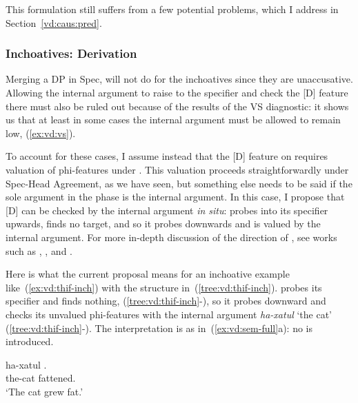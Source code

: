 \begin{exe}
\begin{xlist}
\begin{xlist}
\begin{exe}
\begin{exe}
\begin{xlist}
\begin{exe}
\begin{xlist}
\begin{exe}
\begin{xlist}
\begin{xlist}
\begin{exe}
\begin{xlist}
\begin{exe}
\begin{xlist}
\begin{exe}
\begin{exe}
\begin{exe}
\begin{xlist}
\begin{exe}
\begin{exe}
\begin{xlist}
\begin{xlist}
\begin{exe}
\begin{xlist}
This formulation still suffers from a few potential problems, which I address in Section~\ref{vd:caus:pred}.

		\subsubsection{Inchoatives: Derivation}
Merging a DP in Spec,{\vd} will not do for the inchoatives since they are unaccusative. Allowing the internal argument to raise to the specifier and check the [D] feature there must also be ruled out because of the results of the VS diagnostic: it shows us that at least in some cases the internal argument must be allowed to remain low, (\ref{ex:vd:vs}).

To account for these cases, I assume instead that the [D] feature on {\vd} requires valuation of phi-features under  \citep{nie17,schaefer17oup}. This valuation proceeds straightforwardly under Spec-Head Agreement, as we have seen, but something else needs to be said if the sole argument in the phase is the internal argument. In this case, I propose that [D] can be checked by the internal argument \emph{in situ}: {\vd} probes into its specifier upwards, finds no target, and so it probes downwards and is valued by the internal argument. For more in-depth discussion of the direction of , see works such as \cite{bejarrezac09}, \cite{zeijlstra12}, \cite{preminger13tlr} and \cite{deal15nels}.

Here is what the current proposal means for an inchoative example like~(\ref{ex:vd:thif-inch}) with the structure in~(\ref{tree:vd:thif-inch}). {\vd} probes its specifier and finds nothing, (\ref{tree:vd:thif-inch}-), so it probes downward and checks its unvalued phi-features with the internal argument \emph{ha-xatul} `the cat' (\ref{tree:vd:thif-inch}-). The interpretation is as in~(\ref{ex:vd:sem-full}a): no  is introduced.
 \begin{exe}
\ex \label{ex:vd:thif-inch}  
	{ \gll ha-xatul .\\
 	  the-cat fattened.\\
 	\glt `The cat grew fat.' } 
	
 \z 
	

\end{exe}
\end{xlist}
\end{exe}
\end{xlist}
\end{xlist}
\end{exe}
\end{exe}
\end{xlist}
\end{exe}
\end{exe}
\end{exe}
\end{xlist}
\end{exe}
\end{xlist}
\end{exe}
\end{xlist}
\end{xlist}
\end{exe}
\end{xlist}
\end{exe}
\end{xlist}
\end{exe}
\end{exe}
\end{xlist}
\end{xlist}
\end{exe}
